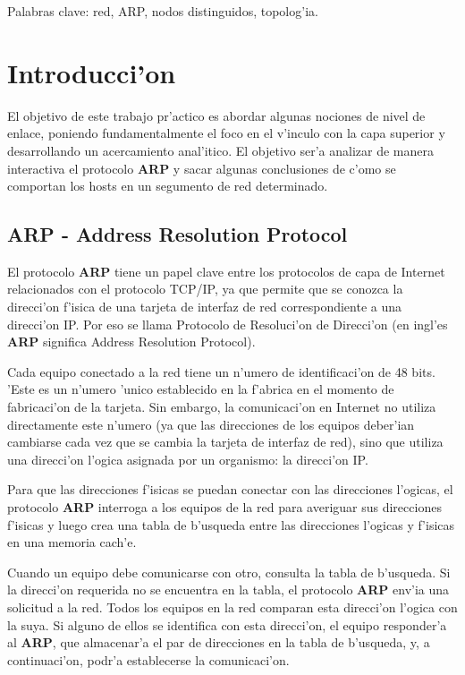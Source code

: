 \documentclass[a4paper,10pt]{article}
\begin{document}
Palabras clave: red, ARP, nodos distinguidos, topolog'ia.


\section{Introducci'on}
\label{intro1:}

El objetivo de este trabajo pr'actico es abordar algunas nociones de nivel de enlace, poniendo fundamentalmente el foco en el v'inculo con la capa superior y desarrollando un acercamiento anal'itico. El objetivo ser'a analizar de manera interactiva el protocolo \textbf{ARP} y sacar algunas conclusiones de c'omo se comportan los hosts en un segumento de red determinado.

\subsection{ARP - Address Resolution Protocol}

El protocolo \textbf{ARP} tiene un papel clave entre los protocolos de capa de Internet relacionados con el protocolo TCP/IP, ya que permite que se conozca la direcci'on f'isica de una tarjeta de interfaz de red correspondiente a una direcci'on IP. Por eso se llama Protocolo de Resoluci'on de Direcci'on (en ingl'es \textbf{ARP} significa Address Resolution Protocol).

\vspace*{5 mm}
Cada equipo conectado a la red tiene un n'umero de identificaci'on de 48 bits. 'Este es un n'umero 'unico establecido en la f'abrica en el momento de fabricaci'on de la tarjeta. Sin embargo, la comunicaci'on en Internet no utiliza directamente este n'umero (ya que las direcciones de los equipos deber'ian cambiarse cada vez que se cambia la tarjeta de interfaz de red), sino que utiliza una direcci'on l'ogica asignada por un organismo: la direcci'on IP.

\vspace*{5 mm}
Para que las direcciones f'isicas se puedan conectar con las direcciones l'ogicas, el protocolo \textbf{ARP} interroga a los equipos de la red para averiguar sus direcciones f'isicas y luego crea una tabla de b'usqueda entre las direcciones l'ogicas y f'isicas en una memoria cach'e.

\vspace*{5 mm}
Cuando un equipo debe comunicarse con otro, consulta la tabla de b'usqueda. Si la direcci'on requerida no se encuentra en la tabla, el protocolo \textbf{ARP} env'ia una solicitud a la red. Todos los equipos en la red comparan esta direcci'on l'ogica con la suya. Si alguno de ellos se identifica con esta direcci'on, el equipo responder'a al \textbf{ARP}, que almacenar'a el par de direcciones en la tabla de b'usqueda, y, a continuaci'on, podr'a establecerse la comunicaci'on. 
\end{document}
